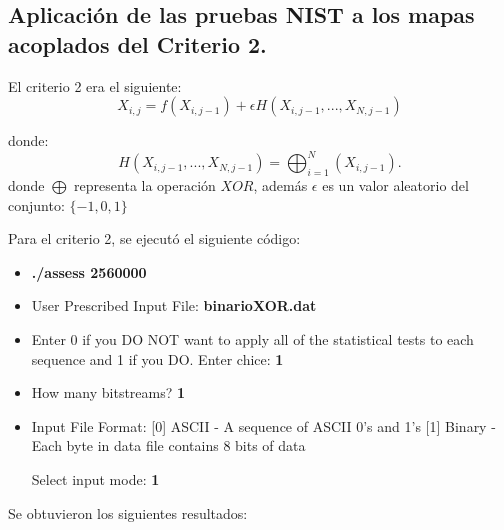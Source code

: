 \documentclass[12pt,3p]{elsarticle}
\begin{document}
\subsection{Aplicación de las pruebas NIST a los mapas acoplados del Criterio 2.}

El criterio 2 era el siguiente:
\begin{equation}
X_{i,j}= f(X_{i,j-1})+ \epsilon  H(X_{i,j-1},...,X_{N,j-1})
\end{equation}

donde:
\begin{equation}
H(X_{i,j-1},...,X_{N,j-1}) = \bigoplus _{i=1}^{N}(X_{i,j-1}).
\end{equation}
donde $\bigoplus$ representa la operación $XOR$, además $\epsilon$ es un valor aleatorio del conjunto: ${\{-1, 0, 1 \}}$


Para el criterio 2, se ejecutó el siguiente código:

\begin{itemize}
\item \textbf{./assess 2560000}
\item User Prescribed Input File: \textbf{binarioXOR.dat}
\item    Enter 0 if you DO NOT want to apply all of the
         statistical tests to each sequence and 1 if you DO. Enter chice: \textbf{1}
                  
\item  How many bitstreams? \textbf{1}

\item Input File Format:
    [0] ASCII - A sequence of ASCII 0's and 1's
    [1] Binary - Each byte in data file contains 8 bits of data

   Select input mode:  \textbf{1}
\end{itemize}


Se obtuvieron los siguientes resultados:
\end{document}
